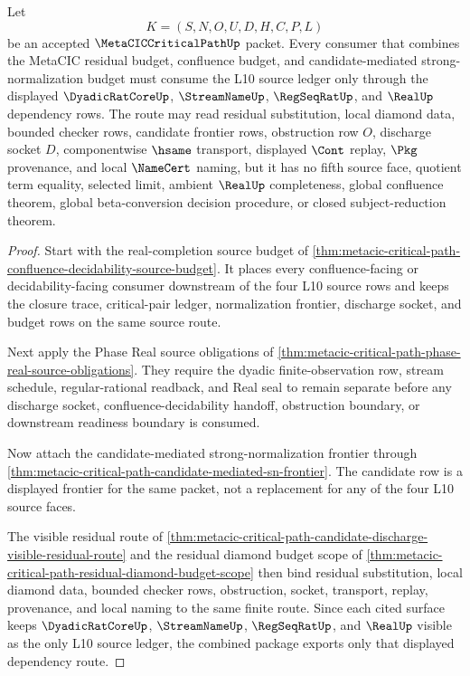\begin{theorem}
\label{thm:metacic-critical-path-mature-package}
Let
$$
K=(S,N,O,U,D,H,C,P,L)
$$
be an accepted $\MetaCICCriticalPathUp$ packet. Every consumer that combines the MetaCIC residual budget, confluence budget, and candidate-mediated strong-normalization budget must consume the L10 source ledger only through the displayed $\DyadicRatCoreUp$, $\StreamNameUp$, $\RegSeqRatUp$, and $\RealUp$ dependency rows. The route may read residual substitution, local diamond data, bounded checker rows, candidate frontier rows, obstruction row $O$, discharge socket $D$, componentwise $\hsame$ transport, displayed $\Cont$ replay, $\Pkg$ provenance, and local $\NameCert$ naming, but it has no fifth source face, quotient term equality, selected limit, ambient $\RealUp$ completeness, global confluence theorem, global beta-conversion decision procedure, or closed subject-reduction theorem.
\end{theorem}
\begin{proof}
Start with the real-completion source budget of \autoref{thm:metacic-critical-path-confluence-decidability-source-budget}. It places every confluence-facing or decidability-facing consumer downstream of the four L10 source rows and keeps the closure trace, critical-pair ledger, normalization frontier, discharge socket, and budget rows on the same source route.

Next apply the Phase Real source obligations of \autoref{thm:metacic-critical-path-phase-real-source-obligations}. They require the dyadic finite-observation row, stream schedule, regular-rational readback, and Real seal to remain separate before any discharge socket, confluence-decidability handoff, obstruction boundary, or downstream readiness boundary is consumed.

Now attach the candidate-mediated strong-normalization frontier through \autoref{thm:metacic-critical-path-candidate-mediated-sn-frontier}. The candidate row is a displayed frontier for the same packet, not a replacement for any of the four L10 source faces.

The visible residual route of \autoref{thm:metacic-critical-path-candidate-discharge-visible-residual-route} and the residual diamond budget scope of \autoref{thm:metacic-critical-path-residual-diamond-budget-scope} then bind residual substitution, local diamond data, bounded checker rows, obstruction, socket, transport, replay, provenance, and local naming to the same finite route. Since each cited surface keeps $\DyadicRatCoreUp$, $\StreamNameUp$, $\RegSeqRatUp$, and $\RealUp$ visible as the only L10 source ledger, the combined package exports only that displayed dependency route.
\end{proof}

